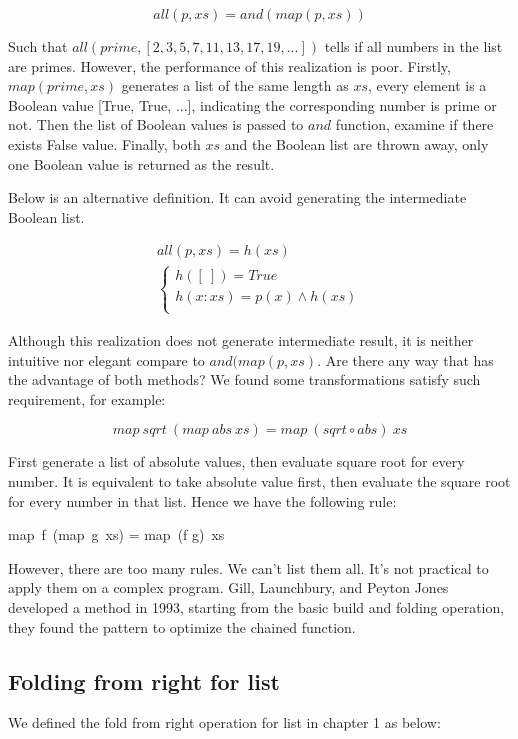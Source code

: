 \documentclass[b5paper]{article}
\begin{document}
\[
all(p, xs) = and(map(p, xs))
\]

Such that $all(prime, [2, 3, 5, 7, 11, 13, 17, 19, ...])$ tells if all numbers in the list are primes. However, the performance of this realization is poor. Firstly, $map(prime, xs)$ generates a list of the same length as $xs$, every element is a Boolean value [True, True, ...], indicating the corresponding number is prime or not. Then the list of Boolean values is passed to $and$ function, examine if there exists False value. Finally, both $xs$ and the Boolean list are thrown away, only one Boolean value is returned as the result.

Below is an alternative definition. It can avoid generating the intermediate Boolean list.

\[
\begin{array}{l}
all(p, xs) = h(xs) \\
  \begin{cases}
  h([\ ]) = True \\
  h(x:xs) = p(x) \land h(xs) \\
  \end{cases}
\end{array}
\]

Although this realization does not generate intermediate result, it is neither intuitive nor elegant compare to $and(map(p, xs)$. Are there any way that has the advantage of both methods? We found some transformations satisfy such requirement, for example:

\[
map\ sqrt\  (map\ abs\ xs) = map\ (sqrt \circ abs)\ xs
\]

First generate a list of absolute values, then evaluate square root for every number. It is equivalent to take absolute value first, then evaluate the square root for every number in that list. Hence we have the following rule:

\be
map\ f\ (map\ g\ xs) = map\ (f \circ g)\ xs
\ee

However, there are too many rules. We can't list them all. It's not practical to apply them on a complex program. Gill, Launchbury, and Peyton Jones developed a method in 1993, starting from the basic build and folding operation, they found the pattern to optimize the chained function.

\subsection{Folding from right for list}

We defined the fold from right operation for list in chapter 1 as below:
\end{document}
